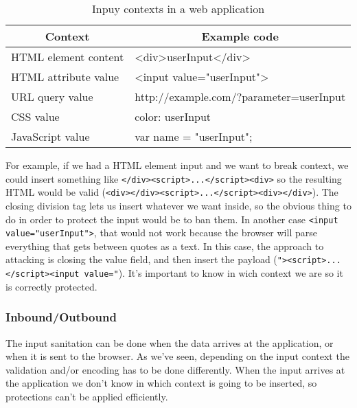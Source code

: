 \begin{table}[]
	\centering
	\caption{Inpuy contexts in a web application}
	\label{my-label}
	\begin{tabular}{|l|l|}
		\hline
		\multicolumn{1}{|c|}{\textbf{Context}} & \multicolumn{1}{c|}{\textbf{Example code}}                         \\ \hline
		HTML element content                   & \textless{}div\textgreater{}userInput\textless{}/div\textgreater{} \\ \hline
		HTML attribute value                   & \textless{}input value="userInput"\textgreater{}                   \\ \hline
		URL query value                        & http://example.com/?parameter=userInput                            \\ \hline
		CSS value                              & color: userInput                                                   \\ \hline
		JavaScript value                       & var name = "userInput";                                            \\ \hline
	\end{tabular}
\end{table}

For example, if we had a HTML element input  and we want to break context, we could insert something like \verb|</div><script>...</script><div>| so the resulting HTML would be valid (\verb|<div></div><script>...</script><div></div>|). The closing division tag lets us insert whatever we want inside, so the obvious thing to do in order to protect the input would be to ban them. In another case \verb|<input value="userInput">|, that would not work because the browser will parse everything that gets between quotes as a text. In this case, the approach to attacking is closing the value field, and then insert the payload (\verb|"><script>...</script><input value="|). It's important to know in wich context we are so it is correctly protected.

\subsubsection{Inbound/Outbound}
The input sanitation can be done when the data arrives at the application, or when it is sent to the browser. As we've seen, depending on the input context the validation and/or encoding has to be done differently. When the input arrives at the application we don't know in which context is going to be inserted, so protections can't be applied efficiently.

